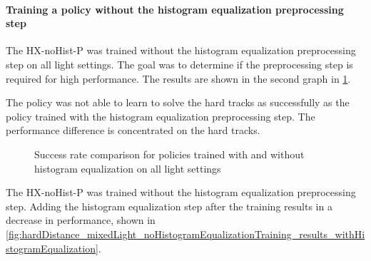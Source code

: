 \paragraph{Training a policy without the histogram equalization preprocessing step}
The \ac{HX-noHist-P} was trained without the histogram equalization preprocessing step on all light settings. The goal was to determine if the preprocessing step is required for high performance. The results are shown in the second graph in \ref{fig:hardDistance_mixedLight_noHistogramEqualizationTraining_results}. 

The policy was not able to learn to solve the hard tracks as successfully as the policy trained with the histogram equalization preprocessing step. The performance difference is concentrated on the hard tracks.

\begin{figure}
    \centering
    \caption{Success rate comparison for policies trained with and without histogram equalization on all light settings}
    \label{fig:hardDistance_mixedLight_noHistogramEqualizationTraining_results}
\end{figure}


The \ac{HX-noHist-P} was trained without the histogram equalization preprocessing step. Adding the histogram equalization step after the training results in a decrease in performance, shown in \ref{fig:hardDistance_mixedLight_noHistogramEqualizationTraining_results_withHistogramEqualization}. 


